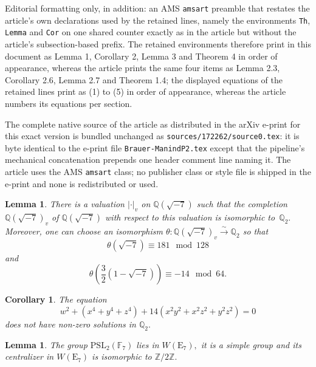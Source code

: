 \documentclass[10pt,a4paper]{amsart}
\newtheorem{Lemma}[Th]{Lemma}
\newtheorem{Cor}[Th]{Corollary}
\begin{document}
Editorial formatting only, in addition: an AMS \texttt{amsart} preamble that restates the article's own declarations used by the retained lines, namely the environments \texttt{Th}, \texttt{Lemma} and \texttt{Cor} on one shared counter exactly as in the article but without the article's subsection-based prefix. The retained environments therefore print in this document as Lemma 1, Corollary 2, Lemma 3 and Theorem 4 in order of appearance, whereas the article prints the same four items as Lemma 2.3, Corollary 2.6, Lemma 2.7 and Theorem 1.4; the displayed equations of the retained lines print as (1) to (5) in order of appearance, whereas the article numbers its equations per section.

The complete native source of the article as distributed in the arXiv e-print for this exact version is bundled unchanged as \texttt{sources/172262/source0.tex}: it is byte identical to the e-print file \texttt{Brauer-ManindP2.tex} except that the pipeline's mechanical concatenation prepends one header comment line naming it. The article uses the AMS \texttt{amsart} class; no publisher class or style file is shipped in the e-print and none is redistributed or used.
\begin{Lemma}\label{lemma:completeQ2}
There is a valuation $|\cdot|_v$ on  $\mathbb{Q}(\sqrt{-7})$ such that the completion~$\mathbb{Q}(\sqrt{-7})_v$ of   $\mathbb{Q}(\sqrt{-7})$ with respect to this valuation is isomorphic to~$\mathbb{Q}_2.$ Moreover, one can choose an isomorphism $\theta:\mathbb{Q}(\sqrt{-7})_{v} \xrightarrow{\sim} \mathbb{Q}_2$ so that
$$
\theta(\sqrt{-7}) \equiv 181 \mod 128
$$
\noindent and 
$$
\theta\left(\frac{3}{2}(1-\sqrt{-7})\right) \equiv -14 \mod 64.
$$ 
\end{Lemma}

\begin{Cor}\label{cor}
The equation 
\begin{equation}\label{eq:equationincorolary}
w^2+(x^4+y^4+z^4)+14(x^2y^2+x^2z^2+y^2z^2)=0
\end{equation}
\noindent does not have  non-zero solutions in $\mathbb{Q}_2.$
\end{Cor}

\begin{Lemma}\label{lemma:centralizer}
The group $\mathrm{PSL}_2(\mathbb{F}_7)$ lies in $W(\mathrm{E}_7),$ it is a simple group and its centralizer in  $W(\mathrm{E}_7)$ is isomorphic to $\mathbb{Z}/2\mathbb{Z}.$
\end{Lemma}
\end{document}
